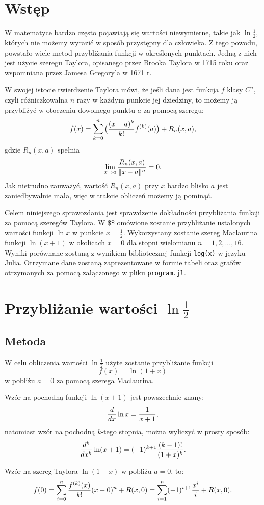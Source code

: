 \documentclass[11pt, wide, leqno]{mwart}
\begin{document}
\maketitle
\tableofcontents

\section{Wstęp}

W matematyce bardzo często pojawiają się wartości niewymierne, takie jak $\ln \frac12$, których nie możemy wyrazić w sposób przystępny dla człowieka. Z tego powodu, powstało wiele metod przybliżania funkcji w określonych punktach. Jedną z nich jest użycie szeregu Taylora, opisanego przez Brooka Taylora w 1715 roku oraz wspomniana przez Jamesa Gregory'a w 1671 r.

W swojej istocie twierdzenie Taylora mówi, że jeśli dana jest funkcja $f$ klasy $C^n$, czyli różniczkowalna $n$ razy w każdym punkcie jej dziedziny, to możemy ją przybliżyć w otoczeniu dowolnego punktu $a$ za pomocą szeregu:
$$f(x)=\sum\limits_{k=0}^n\big({(x-a)^k\over k!} f^{(k)}(a)\big)+R_n(x, a),$$
gdzie $R_n(x, a)$ spełnia
$$\lim\limits_{x\to a}{R_n(x,a)\over\|x-a\|^n}=0.$$
Jak nietrudno zauważyć, wartość $R_n(x, a)$ przy $x$ bardzo blisko $a$ jest zaniedbywalnie mała, więc w trakcie obliczeń możemy ją pominąć.

Celem niniejszego sprawozdania jest sprawdzenie dokładności przybliżania funkcji za pomocą szeregów Taylora. W \$\$ omówione zostanie przybliżanie ustalonych wartości funkcji $\ln x$ w punkcie $x=\frac12$. Wykorzystany zostanie szereg Maclaurina funkcji $\ln(x+1)$ w okolicach $x=0$ dla stopni wielomianu $n=1, 2, ..., 16$. Wyniki porównane zostaną z wynikiem bibliotecznej funkcji \verb+log(x)+ w języku Julia. Otrzymane dane zostaną zaprezentowane w formie tabeli oraz grafów otrzymanych za pomocą załączonego w pliku \verb+program.jl+.

\section{Przybliżanie wartości $\ln\frac12$}

\subsection{Metoda}

W celu obliczenia wartości $\ln\frac12$ użyte zostanie przybliżanie funkcji
$$f(x)=\ln (1+x)$$
w pobliżu $a=0$ za pomocą szerega Maclaurina.

Wzór na pochodną funkcji $\ln (x+1)$ jest powszechnie znany:
$${d\over dx}\ln x=\frac1{x+1},$$
natomiast wzór na pochodną $k$-tego stopnia, można wyliczyć w prosty sposób:
\begin{align}
    {d^k\over dx^k}\ln (x+1)=(-1)^{k+1}{(k-1)!\over(1+x)^{k}}.
\end{align}

Wzór na szereg Taylora $\ln (1+x)$ w pobliżu $a=0$, to:
$$f(0)=\sum\limits_{i=0}^n{f^{(k)}(x)\over k!}(x-0)^n + R(x, 0)=\sum\limits_{i=1}^n(-1)^{i+1}{x^i\over i}+R(x, 0).$$



\koniec
\end{document}
